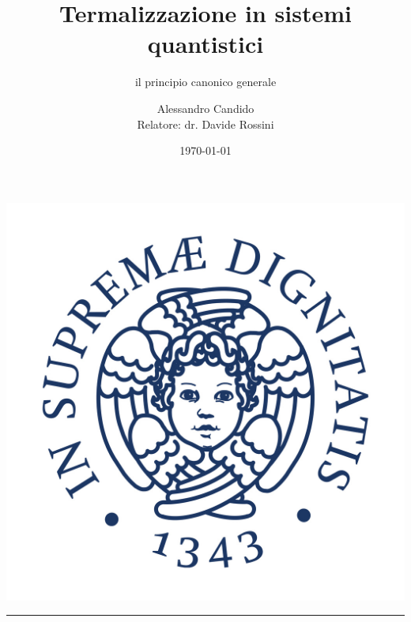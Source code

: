 \documentclass[10pt]{beamer}	%
\title{Termalizzazione in sistemi quantistici}
\subtitle{il principio canonico generale}
\author[Alessandro Candido]{\texorpdfstring{Alessandro Candido\\Relatore: dr. Davide Rossini}{Alessandro Candido}}
\institute{}
\date{\today}
\theoremstyle{definition}
\theoremstyle{plain}
\begin{document}
\begin{frame}
	\begin{center}
		{\includegraphics[scale=0.3]{./Images/logo.jpg}}
		\vspace{-8cm}
		{\textcolor{white}{\rule{\paperwidth}{\paperheight}}}
	\end{center}
	\vspace{-9cm}
	
	\maketitle
\end{frame}
\end{document}
